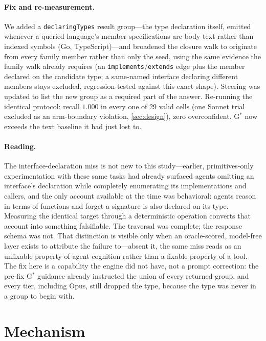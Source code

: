 \documentclass[11pt]{article}
\newcommand{\code}[1]{\texttt{#1}}
\newcommand{\gstar}{G$^{*}$}
\begin{document}
\paragraph{Fix and re-measurement.} We added a \code{declaringTypes} result
group---the type declaration itself, emitted whenever a queried language's
member specifications are body text rather than indexed symbols (Go,
TypeScript)---and broadened the closure walk to originate from every family
member rather than only the seed, using the same evidence the family walk
already requires (an \code{implements}/\code{extends} edge plus the member
declared on the candidate type; a same-named interface declaring different
members stays excluded, regression-tested against this exact shape).
Steering was updated to list the new group as a required part of the
answer. Re-running the identical protocol: recall $1.000$ in every one of
29 valid cells (one Sonnet trial excluded as an arm-boundary violation,
\cref{sec:design}), zero overconfident. \gstar{} now exceeds the text
baseline it had just lost to.

\paragraph{Reading.} The interface-declaration miss is not new to this
study---earlier, primitives-only experimentation with these same tasks had
already surfaced agents omitting an interface's declaration while
completely enumerating its implementations and callers, and the only
account available at the time was behavioral: agents reason in terms of
functions and forget a signature is also declared on its type. Measuring
the identical target through a deterministic operation converts that
account into something falsifiable. The traversal was complete; the
response schema was not. That distinction is visible only when an
oracle-scored, model-free layer exists to attribute the failure to---absent
it, the same miss reads as an unfixable property of agent cognition rather
than a fixable property of a tool. The fix here is a capability the engine
did not have, not a prompt correction: the pre-fix \gstar{} guidance already
instructed the union of every returned group, and every tier, including
Opus, still dropped the type, because the type was never in a group to
begin with.

\section{Mechanism}
\label{sec:mechanism}
\end{document}

